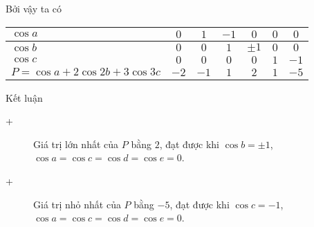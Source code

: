 \begin{bt}
{Bởi vậy ta có
\begin{center}
\begin{tabular}{ |p{6 cm}|c|c|c|c|c|c|} 
\hline
$\cos a$ & $0$ & $1$ & $-1$ & $0$ & $0$ & $0$\\
\hline
$\cos b$ & $0$ & $0$ & $1$ & $\pm 1$ & $0$ & $0$\\
\hline
$\cos c$ & $0$ & $0$ & $0$ & $0$ & $1$ & $-1$\\
\hline
$P=\cos a+2\cos 2b+3\cos 3c$ & $-2$ & $-1$ & $1$ & $2$ & $1$ & $-5$\\
\hline
\end{tabular}
\end{center}
Kết luận
\begin{description}
\item[+] Giá trị lớn nhất của $P$ bằng $2$, đạt được khi $\cos b=\pm 1$, $\cos a=\cos c=\cos d=\cos e=0$.
\item[+] Giá trị nhỏ nhất của $P$ bằng $-5$, đạt được khi $\cos c= -1$, $\cos a=\cos c=\cos d=\cos e=0$.
\end{description}
}
\end{bt}

